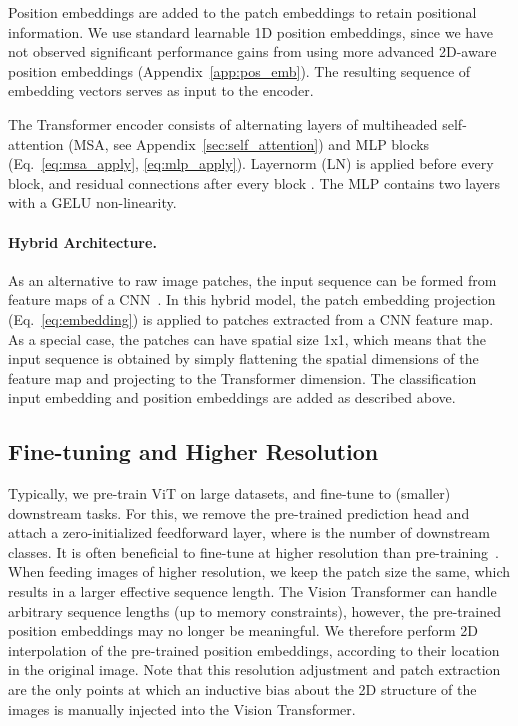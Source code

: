 \documentclass{article} \usepackage{iclr2021_conference,times}
\newcommand{\oursfull}{Vision Transformer\xspace}
\begin{document}
Position embeddings are added to the patch embeddings to retain positional information.
We use standard learnable 1D position embeddings, since we have not observed significant performance gains from using more advanced 2D-aware position embeddings  (Appendix~\ref{app:pos_emb}).
The resulting sequence of embedding vectors serves as input to the encoder.

The Transformer encoder \citep{vaswani2017} consists of alternating layers of multiheaded self-attention (MSA, see Appendix~\ref{sec:self_attention}) and MLP blocks (Eq.~\ref{eq:msa_apply}, \ref{eq:mlp_apply}).
Layernorm (LN) is applied before every block, and residual connections after every block \citep{wang2019-preLN,Baevski2019Adaptive}.
The MLP contains two layers with a GELU non-linearity.



\paragraph{Hybrid Architecture.}
As an alternative to raw image patches, the input sequence can be formed from feature maps of a CNN~\citep{LeCun1989BackpropagationAT}.
In this hybrid model, the patch embedding projection   (Eq.~\ref{eq:embedding}) is applied to patches extracted from a CNN feature map.
As a special case, the patches can have spatial size 1x1, which means that the input sequence is obtained by simply flattening the spatial dimensions of the feature map and projecting to the Transformer dimension.  
The classification input embedding and position embeddings are added as described above.

\subsection{Fine-tuning and Higher Resolution}

Typically, we pre-train ViT on large datasets, and fine-tune to (smaller) downstream  tasks.
For this, we remove the pre-trained prediction head and attach a zero-initialized  feedforward layer, where  is the number of downstream classes.
It is often beneficial to fine-tune at higher resolution than pre-training~\citep{touvron2019,kolesnikov2020-bit}.
When feeding images of higher resolution, we keep the patch size the same, which results in a larger effective sequence length.
The \oursfull{} can handle arbitrary sequence lengths (up to memory constraints), however, the pre-trained position embeddings may no longer be meaningful.
We therefore perform 2D interpolation of the pre-trained position embeddings, according to their location in the original image.
Note that this resolution adjustment and patch extraction are the only points at which an inductive bias about the 2D structure of the images is manually injected into the \oursfull{}.
\end{document}
